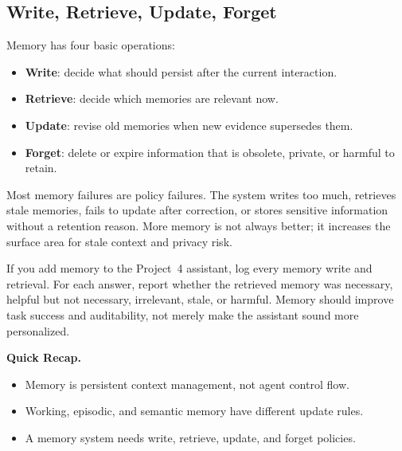 \subsection{Write, Retrieve, Update, Forget}

Memory has four basic operations:

\begin{itemize}[nosep]
  \item \textbf{Write}: decide what should persist after the current interaction.
  \item \textbf{Retrieve}: decide which memories are relevant now.
  \item \textbf{Update}: revise old memories when new evidence supersedes them.
  \item \textbf{Forget}: delete or expire information that is obsolete, private, or harmful to retain.
\end{itemize}

Most memory failures are policy failures. The system writes too much, retrieves stale memories, fails to update after correction, or stores sensitive information without a retention reason. More memory is not always better; it increases the surface area for stale context and privacy risk.

\begin{tcolorbox}[colback=orange!5, colframe=orange!60, title=\textbf{For Project~4: Evaluate Memory as Evidence, Not Vibes}]
If you add memory to the Project~4 assistant, log every memory write and retrieval. For each answer, report whether the retrieved memory was necessary, helpful but not necessary, irrelevant, stale, or harmful. Memory should improve task success and auditability, not merely make the assistant sound more personalized.
\end{tcolorbox}

\begin{quickrecap}
\textbf{Quick Recap.}
\begin{itemize}[nosep,leftmargin=1.5em]
  \item Memory is persistent context management, not agent control flow.
  \item Working, episodic, and semantic memory have different update rules.
  \item A memory system needs write, retrieve, update, and forget policies.
\end{itemize}
\end{quickrecap}



